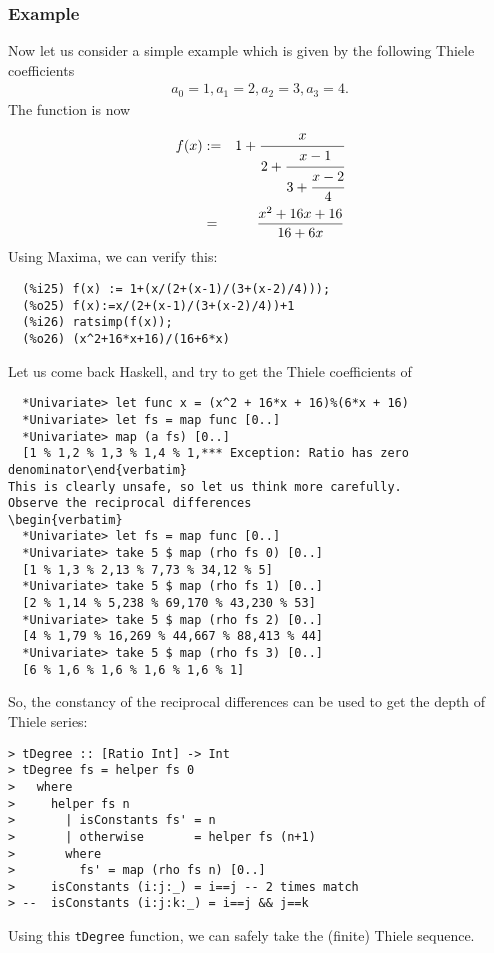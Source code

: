 \documentclass[11pt]{book}
\begin{document}
\subsubsection{Example}
Now let us consider a simple example which is given by the following Thiele coefficients
\begin{eqnarray}
a_0 = 1, a_1 = 2, a_2 = 3, a_3=4.
\end{eqnarray}
The function is now
\begin{eqnarray}
f(x) &:=& 1 + \cfrac{x}{2+\cfrac{x-1}{3+\cfrac{x-2}{4}}} \\
&=& \frac{x^2+16x+16}{16+6x}
\end{eqnarray}
Using Maxima, we can verify this:
\begin{verbatim}
  (%i25) f(x) := 1+(x/(2+(x-1)/(3+(x-2)/4)));
  (%o25) f(x):=x/(2+(x-1)/(3+(x-2)/4))+1
  (%i26) ratsimp(f(x));
  (%o26) (x^2+16*x+16)/(16+6*x)
\end{verbatim}
Let us come back Haskell, and try to get the Thiele coefficients of
\begin{verbatim}
  *Univariate> let func x = (x^2 + 16*x + 16)%(6*x + 16)
  *Univariate> let fs = map func [0..]
  *Univariate> map (a fs) [0..]
  [1 % 1,2 % 1,3 % 1,4 % 1,*** Exception: Ratio has zero denominator\end{verbatim}
This is clearly unsafe, so let us think more carefully.
Observe the reciprocal differences
\begin{verbatim}
  *Univariate> let fs = map func [0..]
  *Univariate> take 5 $ map (rho fs 0) [0..]
  [1 % 1,3 % 2,13 % 7,73 % 34,12 % 5]
  *Univariate> take 5 $ map (rho fs 1) [0..]
  [2 % 1,14 % 5,238 % 69,170 % 43,230 % 53]
  *Univariate> take 5 $ map (rho fs 2) [0..]
  [4 % 1,79 % 16,269 % 44,667 % 88,413 % 44]
  *Univariate> take 5 $ map (rho fs 3) [0..]
  [6 % 1,6 % 1,6 % 1,6 % 1,6 % 1]
\end{verbatim}
So, the constancy of the reciprocal differences can be used to get the depth of Thiele series:
\begin{verbatim}
> tDegree :: [Ratio Int] -> Int
> tDegree fs = helper fs 0
>   where
>     helper fs n
>       | isConstants fs' = n
>       | otherwise       = helper fs (n+1)
>       where
>         fs' = map (rho fs n) [0..]
>     isConstants (i:j:_) = i==j -- 2 times match
> --  isConstants (i:j:k:_) = i==j && j==k
\end{verbatim}
Using this \verb+tDegree+ function, we can safely take the (finite) Thiele sequence.
\end{document}
